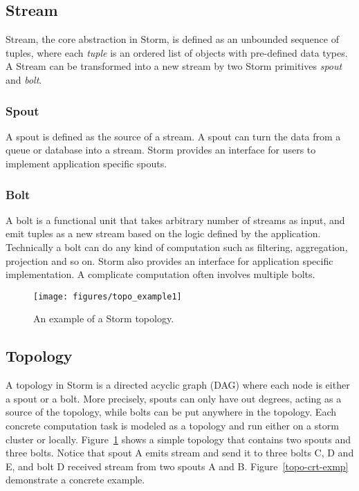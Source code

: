 \documentclass[conference, twocolumn, 11pt]{IEEEtran}
\theoremstyle{definition}
\begin{document}
\subsection{Stream}
Stream, the core abstraction in Storm, is defined as an unbounded sequence of tuples, where each \emph{tuple} is an ordered list of objects with pre-defined data types. A Stream can be transformed into a new stream by two Storm primitives \emph{spout} and \emph{bolt}.

\subsubsection{Spout}
A spout is defined as the source of a stream. A spout can turn the data from a queue or database into a stream. Storm provides an  interface for users to implement application specific spouts.

\subsubsection{Bolt}
A bolt is a functional unit that takes arbitrary number of streams as input, and emit tuples as a new stream based on the logic defined by the application. Technically a bolt can do any kind of computation such as filtering, aggregation, projection and so on. Storm also provides an interface for application specific implementation. A complicate computation often involves multiple bolts.
\begin{figure}[hbt]
\centering
\texttt{[image: figures/topo\_example1]}
\caption{An example of a Storm topology.}
\label{topo-exmp}
\end{figure}

\subsection{Topology}\label{storm}
A topology in Storm is a directed acyclic graph (DAG) where each node is either a spout or a bolt. More precisely, spouts can only have out degrees, acting as a source of the topology, while bolts can be put anywhere in the topology. Each concrete computation task is modeled as a topology and run either on a storm cluster or locally.
Figure~\ref{topo-exmp} shows a simple topology that contains two spouts and three bolts. Notice that spout A emits stream and send it to three bolts C, D and E, and bolt D received stream from two spouts A and B. Figure~\ref{topo-crt-exmp} demonstrate a concrete example.
\end{document}
